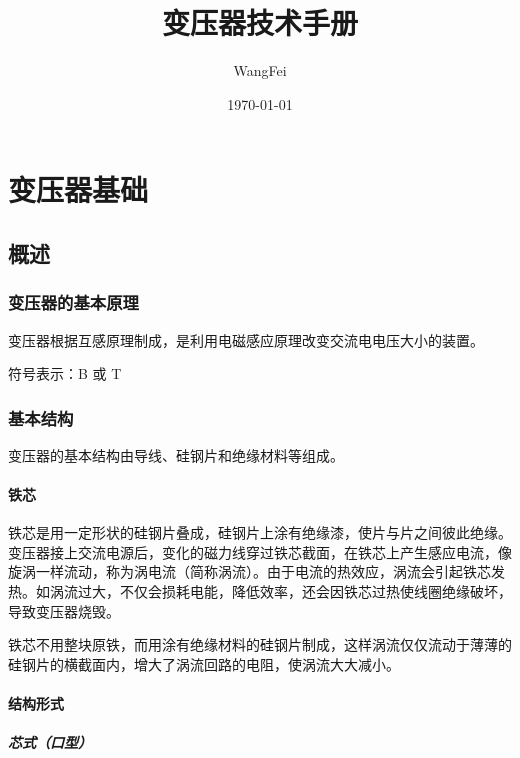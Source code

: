 \documentclass[12pt,UTF8]{ctexbook}
\title{\heiti\zihao{0} 变压器技术手册}
\author{WangFei}
\date{\today}
\begin{document}
\maketitle
\tableofcontents

\mainmatter

\part{变压器基础}

\chapter{概述}
\label{chap:overview}

\section{变压器的基本原理}

变压器根据互感原理制成，是利用电磁感应原理改变交流电电压大小的装置。

符号表示：B 或 T

\section{基本结构}

变压器的基本结构由导线、硅钢片和绝缘材料等组成。

\subsection{铁芯}

铁芯是用一定形状的硅钢片叠成，硅钢片上涂有绝缘漆，使片与片之间彼此绝缘。变压器接上交流电源后，变化的磁力线穿过铁芯截面，在铁芯上产生感应电流，像旋涡一样流动，称为涡电流（简称涡流）。由于电流的热效应，涡流会引起铁芯发热。如涡流过大，不仅会损耗电能，降低效率，还会因铁芯过热使线圈绝缘破坏，导致变压器烧毁。

铁芯不用整块原铁，而用涂有绝缘材料的硅钢片制成，这样涡流仅仅流动于薄薄的硅钢片的横截面内，增大了涡流回路的电阻，使涡流大大减小。

\subsection{结构形式}

\subsubsection{芯式（口型）}
\end{document}
